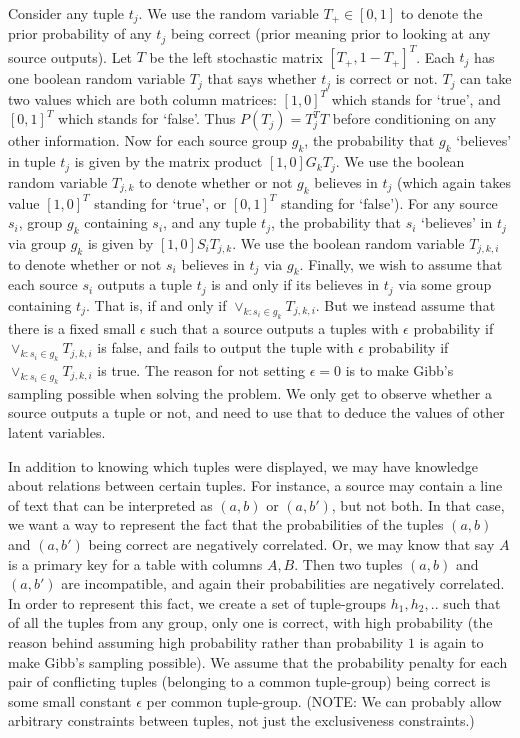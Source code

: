 \documentclass{sig-alternate}
\newcounter{prob}
\begin{document}
Consider any tuple $t_j$. We use the random variable $T_{+} \in [0,1]$ to denote the prior probability of any $t_j$ being correct (prior meaning prior to looking at any source outputs). Let $T$ be the left stochastic matrix $[T_{+},1-T_{+}]^T$. Each $t_j$ has one boolean random variable $T_j$ that says whether $t_j$ is correct or not. $T_j$ can take two values which are both column matrices: $[1,0]^T$ which stands for `true', and $[0,1]^T$ which stands for `false'. Thus $P(T_j) = T_{j}^{T}T$ before conditioning on any other information. Now for each source group $g_k$, the probability that $g_k$ `believes' in tuple $t_j$ is given by the matrix product $[1,0]G_kT_j$. We use the boolean random variable $T_{j,k}$ to denote whether or not $g_k$ believes in $t_j$ (which again takes value $[1,0]^T$ standing for `true', or $[0,1]^T$ standing for `false'). For any source $s_i$, group $g_k$ containing $s_i$, and any tuple $t_j$, the probability that $s_i$ `believes' in $t_j$ via group $g_k$ is given by $[1,0]S_iT_{j,k}$. We use the boolean random variable $T_{j,k,i}$ to denote whether or not $s_i$ believes in $t_j$ via $g_k$. Finally, we wish to assume that each source $s_i$ outputs a tuple $t_j$ is and only if its believes in $t_j$ via some group containing $t_j$. That is, if and only if $\lor_{k : s_i \in g_k} T_{j,k,i}$. But we instead assume that there is a fixed small $\epsilon$ such that a source outputs a tuples with $\epsilon$ probability if $\lor_{k : s_i \in g_k} T_{j,k,i}$ is false, and fails to output the tuple with $\epsilon$ probability if $\lor_{k : s_i \in g_k} T_{j,k,i}$ is true. The reason for not setting $\epsilon = 0$ is to make Gibb's sampling possible when solving the problem. We only get to observe whether a source outputs a tuple or not, and need to use that to deduce the values of other latent variables. 

In addition to knowing which tuples were displayed, we may have knowledge about relations between certain tuples. For instance, a source may contain a line of text that can be interpreted as $(a,b)$ or $(a, b')$, but not both. In that case, we want a way to represent the fact that the probabilities of the tuples $(a, b)$ and $(a, b')$ being correct are negatively correlated. Or, we may know that say $A$ is a primary key for a table with columns $A,B$. Then two tuples $(a,b)$ and $(a,b')$ are incompatible, and again their probabilities are negatively correlated. In order to represent this fact, we create a set of tuple-groups $h_1, h_2, ..$ such that of all the tuples from any group, only one is correct, with high probability (the reason behind assuming high probability rather than probability $1$ is again to make Gibb's sampling possible). We assume that the probability penalty for each pair of conflicting tuples (belonging to a common tuple-group) being correct is some small constant $\epsilon$ per common tuple-group. (NOTE: We can probably allow arbitrary constraints between tuples, not just the exclusiveness constraints.)
\end{document}

